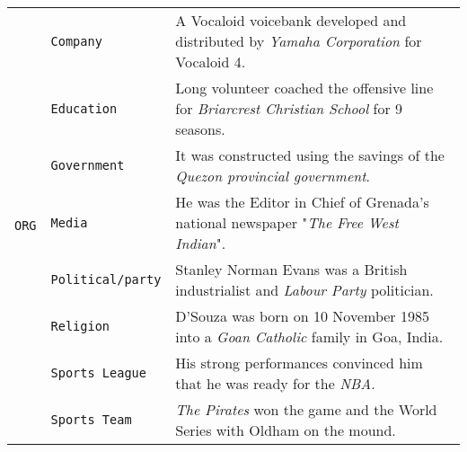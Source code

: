 \documentclass[11pt,a4paper, dvipsnames]{article}
\begin{document}
\begin{longtable}{clp{9.5cm}}
\multirow{10}{*}{\texttt{\color{Mahogany}ORG}}                & \texttt{\color{Mahogany}Company}             & A Vocaloid voicebank developed and distributed by \textit{\color{Mahogany}Yamaha Corporation} for Vocaloid 4.                                                           \\ \cmidrule(r){2-2} \cmidrule(r){3-3} 
                                              & \texttt{\color{Mahogany}Education}           & Long volunteer coached the offensive line for \textit{\color{Mahogany}Briarcrest Christian School} for 9 seasons.                                                       \\ \cmidrule(r){2-2} \cmidrule(r){3-3}
                                              & \texttt{\color{Mahogany}Government}          & It was constructed using the savings of the \textit{\color{Mahogany}Quezon provincial government}.                                                                      \\ \cmidrule(r){2-2} \cmidrule(r){3-3}
                                              & \texttt{\color{Mahogany}Media}               & He was the Editor in Chief of Grenada’s national newspaper "\textit{\color{Mahogany}The Free West Indian}".                                                             \\ \cmidrule(r){2-2} \cmidrule(r){3-3}
                                              & \texttt{\color{Mahogany}Political/party}    & Stanley Norman Evans was a British industrialist and \textit{\color{Mahogany}Labour Party} politician.                                                                  \\ \cmidrule(r){2-2} \cmidrule(r){3-3}
                                              & \texttt{\color{Mahogany}Religion}            & D'Souza was born on 10 November 1985 into a \textit{\color{Mahogany}Goan Catholic} family in Goa, India.                                                                \\ \cmidrule(r){2-2} \cmidrule(r){3-3}
                                              & \texttt{\color{Mahogany}Sports League}      & His strong performances convinced him that he was ready for the \textit{\color{Mahogany}NBA}.                                                                           \\ \cmidrule(r){2-2} \cmidrule(r){3-3}
                                              & \texttt{\color{Mahogany}Sports Team}        & \textit{\color{Mahogany}The Pirates} won the game and the World Series with Oldham on the mound.                                                                        \\ \cmidrule(r){2-2} \cmidrule(r){3-3}

\end{longtable}
\end{document}

